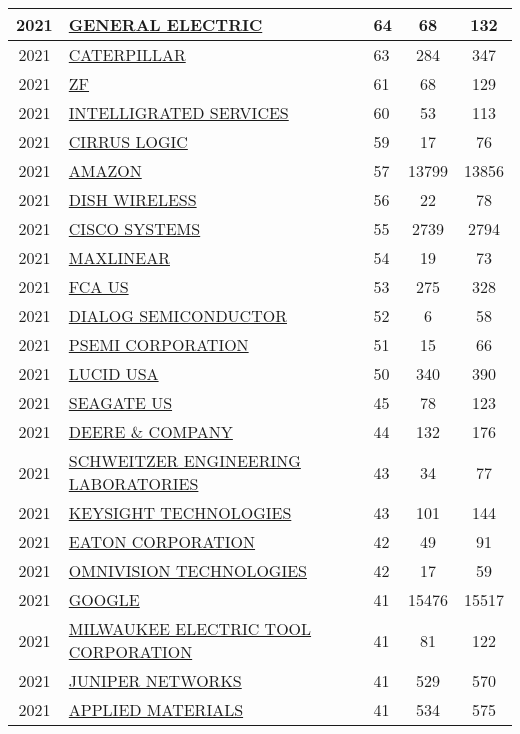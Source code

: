 \documentclass{article}%
\begin{document}
\begin{longtable}{c|p{20em}|p{5em}|c|c}
\hline%
2021&\hyperref[subsec:GENERALELECTRIC]{GENERAL ELECTRIC}&64&68&132\\%
\hline%
2021&\hyperref[subsec:CATERPILLAR]{CATERPILLAR}&63&284&347\\%
\hline%
2021&\hyperref[subsec:ZF]{ZF}&61&68&129\\%
\hline%
2021&\hyperref[subsec:INTELLIGRATEDSERVICES]{INTELLIGRATED SERVICES}&60&53&113\\%
\hline%
2021&\hyperref[subsec:CIRRUSLOGIC]{CIRRUS LOGIC}&59&17&76\\%
\hline%
2021&\hyperref[subsec:AMAZON]{AMAZON}&57&13799&13856\\%
\hline%
2021&\hyperref[subsec:DISHWIRELESS]{DISH WIRELESS}&56&22&78\\%
\hline%
2021&\hyperref[subsec:CISCOSYSTEMS]{CISCO SYSTEMS}&55&2739&2794\\%
\hline%
2021&\hyperref[subsec:MAXLINEAR]{MAXLINEAR}&54&19&73\\%
\hline%
2021&\hyperref[subsec:FCAUS]{FCA US}&53&275&328\\%
\hline%
2021&\hyperref[subsec:DIALOGSEMICONDUCTOR]{DIALOG SEMICONDUCTOR}&52&6&58\\%
\hline%
2021&\hyperref[subsec:PSEMICORPORATION]{PSEMI CORPORATION}&51&15&66\\%
\hline%
2021&\hyperref[subsec:LUCIDUSA]{LUCID USA}&50&340&390\\%
\hline%
2021&\hyperref[subsec:SEAGATEUS]{SEAGATE US}&45&78&123\\%
\hline%
2021&\hyperref[subsec:DEERECOMPANY]{DEERE \& COMPANY}&44&132&176\\%
\hline%
2021&\hyperref[subsec:SCHWEITZERENGINEERINGLABORATORIES]{SCHWEITZER ENGINEERING LABORATORIES}&43&34&77\\%
\hline%
2021&\hyperref[subsec:KEYSIGHTTECHNOLOGIES]{KEYSIGHT TECHNOLOGIES}&43&101&144\\%
\hline%
2021&\hyperref[subsec:EATONCORPORATION]{EATON CORPORATION}&42&49&91\\%
\hline%
2021&\hyperref[subsec:OMNIVISIONTECHNOLOGIES]{OMNIVISION TECHNOLOGIES}&42&17&59\\%
\hline%
2021&\hyperref[subsec:GOOGLE]{GOOGLE}&41&15476&15517\\%
\hline%
2021&\hyperref[subsec:MILWAUKEEELECTRICTOOLCORPORATION]{MILWAUKEE ELECTRIC TOOL CORPORATION}&41&81&122\\%
\hline%
2021&\hyperref[subsec:JUNIPERNETWORKS]{JUNIPER NETWORKS}&41&529&570\\%
\hline%
2021&\hyperref[subsec:APPLIEDMATERIALS]{APPLIED MATERIALS}&41&534&575\\%

\end{longtable}
\end{document}
